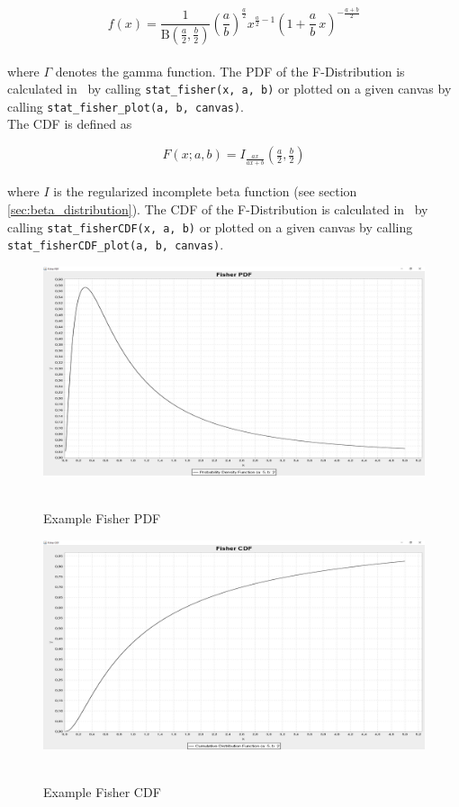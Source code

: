 		$$
			f(x) = \frac{1}{\mathrm{B}\!\left(\frac{a}{2},\frac{b}{2}\right)} \left(\frac{a}{b}\right)^{\frac{a}{2}} x^{\frac{a}{2} - 1} \left(1+\frac{a}{b}\,x\right)^{-\frac{a+b}{2}}
		$$
		\\[0.3cm]
		where $\Gamma$ denotes the gamma function. The \ac{PDF} of the F-Distribution is calculated in \setlx\ by calling \lstinline{stat_fisher(x, a, b)} or plotted on a given canvas by calling \lstinline{stat_fisher_plot(a, b, canvas)}.
		\\[0.3cm]
		The \ac{CDF} is defined as

		$$F(x; a,b)=I_{\frac{a x}{a x + b}}\left (\tfrac{a}{2}, \tfrac{b}{2} \right)$$
		\\[0.3cm]
		where $I$ is the regularized incomplete beta function (see section \ref{sec:beta_distribution}). The \ac{CDF} of the F-Distribution is calculated in \setlx\ by calling \lstinline{stat_fisherCDF(x, a, b)} or plotted on a given canvas by calling \lstinline{stat_fisherCDF_plot(a, b, canvas)}.

		\begin{figure}[H]
			\centering
			\includegraphics[width=1\textwidth]{Figures/implemented_functions/fisher_pdf}~\\
			\caption{Example Fisher PDF}
			\label{fig:fisher_pdf}
		\end{figure}


		\begin{figure}[H]
			\centering
			\includegraphics[width=1\textwidth]{Figures/implemented_functions/fisher_cdf}~\\
			\caption{Example Fisher CDF}
			\label{fig:fisher_cdf}
		\end{figure}


